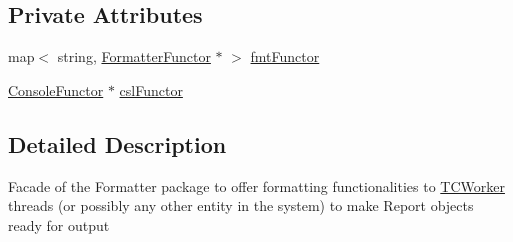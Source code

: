 \subsection*{Private Attributes}
\begin{DoxyCompactItemize}
\item 
map$<$ string, \hyperlink{classit_1_1testbench_1_1formatter_1_1FormatterFunctor}{Formatter\-Functor} $\ast$ $>$ \hyperlink{classit_1_1testbench_1_1formatter_1_1FormatterManager_abd0281f3608746fb1f324154526c87e7}{fmt\-Functor}
\item 
\hyperlink{classit_1_1testbench_1_1formatter_1_1ConsoleFunctor}{Console\-Functor} $\ast$ \hyperlink{classit_1_1testbench_1_1formatter_1_1FormatterManager_a47578a7455b65cfaa1ab3c42df2c7c84}{csl\-Functor}
\end{DoxyCompactItemize}


\subsection{Detailed Description}
Facade of the Formatter package to offer formatting functionalities to \hyperlink{classTCWorker}{T\-C\-Worker} threads (or possibly any other entity in the system) to make Report objects ready for output 

